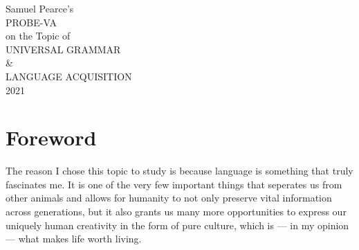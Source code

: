 \documentclass[a4paper,10pt]{article}
\begin{document}
\begingroup%
\centering
\vfill
\Large{Samuel Pearce's}\\
\huge{PROBE-VA}\\
\Large{on the Topic of}\\[\baselineskip]
\Huge{UNIVERSAL GRAMMAR}\\
\huge{\&}\\
\Huge{LANGUAGE ACQUISITION}\\[\baselineskip]
\large{\scshape 2021}\par
\vfill\null
\endgroup

\begin{abstract}
	The goal of this project was twofold: for one half, I intended to expand my knowledge on
	the topic of Chomsky's Universal Grammar theory by reading an introductory book on
	the matter and writing a paper summarising my findings and opinion on the concept. For the other
	half, I conducted an informal experiment with two participants in which I taught them both the language
	Toki Pona\footnotemark through two of the most common methods; one learned through pure immersion,
	while the other learned using the Toki Pona official course book. Finally, with the results of
	both halves of the project complete, I summarised my findings about universal grammar into a
	seperate document and compiled the experiment results here alongside my reflection on the
	project as a whole.
\end{abstract}


\pagebreak


\tableofcontents
\pagebreak


\section{Foreword}
The reason I chose this topic to study is because language is something that truly fascinates me.
It is one of the very few important things that seperates us from other animals and allows for humanity
to not only preserve vital information across generations, but it also
grants us many more opportunities to express our uniquely human creativity in the form of pure
culture, which is --- in my opinion --- what makes life worth living.
\end{document}
